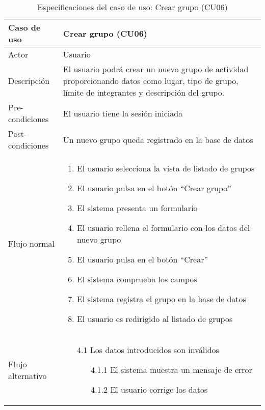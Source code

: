 \begin{table}[h]
    \centering
    \begin{tabular}{|m{3cm}|m{11cm}|}
        \hline
        \rowcolor{blue!20} Caso de uso & Crear grupo (CU06) \\
        \hline
        Actor & Usuario \\
        \hline
        \rowcolor{blue!20} Descripción & El usuario podrá crear un nuevo grupo de actividad proporcionando datos como lugar, tipo de grupo, límite de integrantes y descripción del grupo. \\
        \hline
        Pre-condiciones & El usuario tiene la sesión iniciada \\
        \hline
        \rowcolor{blue!20} Post-condiciones & Un nuevo grupo queda registrado en la base de datos \\
        \hline
        Flujo normal & 
            \begin{enumerate}[noitemsep]
            \item El usuario selecciona la vista de listado de grupos
            \item El usuario pulsa en el botón \enquote{Crear grupo}
            \item El sistema presenta un formulario
            \item El usuario rellena el formulario con los datos del nuevo grupo
            \item El usuario pulsa en el botón \enquote{Crear}
            \item El sistema comprueba los campos
            \item El sistema registra el grupo en la base de datos
            \item El usuario es redirigido al listado de grupos
            \end{enumerate}
         \\
         \hline
        Flujo alternativo & 
        \begin{enumerate}[noitemsep]
            \item[4.1] Los datos introducidos son inválidos
            \begin{enumerate}[noitemsep]
                \item[4.1.1] El sistema muestra un mensaje de error
                \item[4.1.2] El usuario corrige los datos
            \end{enumerate}
        \end{enumerate} \\
        \hline
    \end{tabular}
    \caption{Especificaciones del caso de uso: Crear grupo (CU06)}
\end{table}
